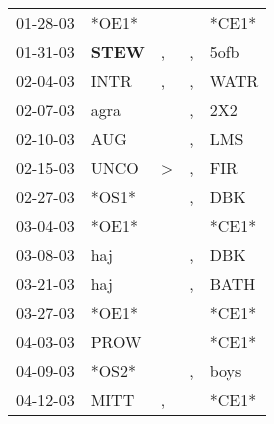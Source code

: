 \begin{supertabular}{p{0.07\textwidth}p{0.06\textwidth}p{0.02\textwidth}p{0.02\textwidth}p{0.06\textwidth}}
          01-28-03\textsuperscript{} &                            *OE1* &                  &                  &                            *CE1* \\
          01-31-03\textsuperscript{} &  \textbf{STEW\textsuperscript{}} &                , &                , &           5ofb\textsuperscript{} \\
          02-04-03\textsuperscript{} &           INTR\textsuperscript{} &                , &                , &           WATR\textsuperscript{} \\
          02-07-03\textsuperscript{} &           agra\textsuperscript{} &                  &                , &            2X2\textsuperscript{} \\
          02-10-03\textsuperscript{} &            AUG\textsuperscript{} &                  &                , &            LMS\textsuperscript{} \\
          02-15-03\textsuperscript{} &           UNCO\textsuperscript{} &     \textgreater &                , &            FIR\textsuperscript{} \\
          02-27-03\textsuperscript{} &                            *OS1* &                  &                , &            DBK\textsuperscript{} \\
          03-04-03\textsuperscript{} &                            *OE1* &                  &                  &                            *CE1* \\
          03-08-03\textsuperscript{} &            haj\textsuperscript{} &                  &                , &            DBK\textsuperscript{} \\
          03-21-03\textsuperscript{} &            haj\textsuperscript{} &                  &                , &           BATH\textsuperscript{} \\
          03-27-03\textsuperscript{} &                            *OE1* &                  &                  &                            *CE1* \\
          04-03-03\textsuperscript{} &           PROW\textsuperscript{} &                  &                  &                            *CE1* \\
          04-09-03\textsuperscript{} &                            *OS2* &                  &                , &           boys\textsuperscript{} \\
          04-12-03\textsuperscript{} &           MITT\textsuperscript{} &                , &                  &                            *CE1* \\

\end{supertabular}
